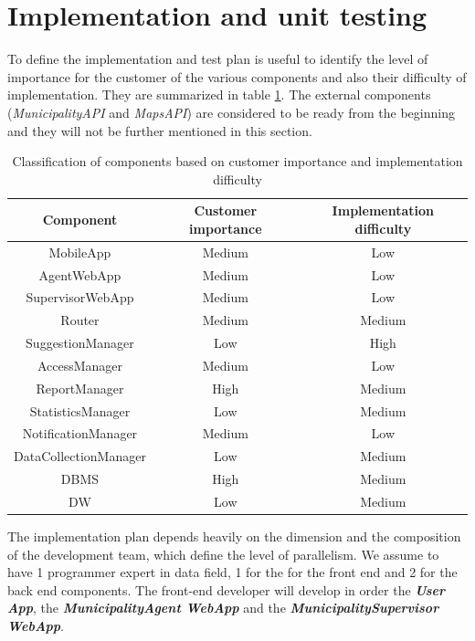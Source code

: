 \documentclass[a4paper]{report}
\begin{document}
\section{Implementation and unit testing}
To define the implementation and test plan is useful to identify the level of importance for the customer of the various components and also their difficulty of implementation. They are summarized in table \ref{tab-testing}. The external components (\textit{MunicipalityAPI} and \textit{MapsAPI}) are considered to be ready from the beginning and they will not be further mentioned in this section.\\
\begin{table}[H]  
  \centering
  \bgroup
  \def\arraystretch{1.5}%
  \begin{tabular}{|c|c|c|}
    \cline{1-3}
    \textbf{Component} & \textbf{Customer importance} & \textbf{Implementation difficulty} \\ \hline
    MobileApp & Medium & Low   \\ \hline
    AgentWebApp & Medium & Low   \\ \hline
    SupervisorWebApp & Medium & Low   \\ \hline
    Router & Medium & Medium   \\ \hline
    SuggestionManager & Low & High   \\ \hline
    AccessManager & Medium & Low   \\ \hline
    ReportManager & High & Medium   \\ \hline
    StatisticsManager & Low & Medium   \\ \hline
    NotificationManager & Medium & Low   \\ \hline
    DataCollectionManager & Low & Medium   \\ \hline
    DBMS & High & Medium   \\ \hline
    DW & Low & Medium   \\ \hline
    
  \end{tabular}
  \egroup
  \caption{Classification of components based on customer importance and implementation difficulty}
  \label{tab-testing}
\end{table}
The implementation plan depends heavily on the dimension and the composition of the development team, which define the level of parallelism.
We assume to have 1 programmer expert in data field, 1 for the for the front end and 2 for the back end components.
The front-end developer will develop in order the \textbf{\textit{User App}}, the \textbf{\textit{MunicipalityAgent WebApp}} and the \textbf{\textit{MunicipalitySupervisor WebApp}}.\\
\end{document}
